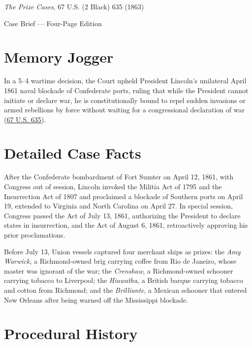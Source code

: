 \documentclass[12pt]{article}
\begin{document}
\begin{center}
{\LARGE \textit{The Prize Cases}, 67 U.S. (2 Black) 635 (1863)\par}
\vspace{0.8em}
{\large Case Brief --- Four-Page Edition\par}
\end{center}
\vspace{1em}

\section{Memory Jogger}

In a 5--4 wartime decision, the Court upheld President Lincoln's unilateral April 1861 naval blockade of Confederate ports, ruling that while the President cannot initiate or declare war, he is constitutionally bound to repel sudden invasions or armed rebellions by force without waiting for a congressional declaration of war (\href{https://supreme.justia.com/cases/federal/us/67/635/}{67 U.S. 635}).

\section{Detailed Case Facts}

After the Confederate bombardment of Fort Sumter on April 12, 1861, with Congress out of session, Lincoln invoked the Militia Act of 1795 and the Insurrection Act of 1807 and proclaimed a blockade of Southern ports on April 19, extended to Virginia and North Carolina on April 27. In special session, Congress passed the Act of July 13, 1861, authorizing the President to declare states in insurrection, and the Act of August 6, 1861, retroactively approving his prior proclamations.

Before July 13, Union vessels captured four merchant ships as prizes: the \textit{Amy Warwick}, a Richmond-owned brig carrying coffee from Rio de Janeiro, whose master was ignorant of the war; the \textit{Crenshaw}, a Richmond-owned schooner carrying tobacco to Liverpool; the \textit{Hiawatha}, a British barque carrying tobacco and cotton from Richmond; and the \textit{Brilliante}, a Mexican schooner that entered New Orleans after being warned off the Mississippi blockade.

\section{Procedural History}
\end{document}
